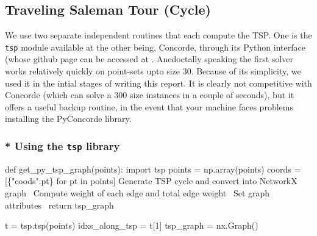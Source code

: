\subsection{Traveling Saleman Tour (Cycle)}

We use two separate independent routines that each compute the TSP. One is the 
\verb|tsp| module available at 
the other being, Concorde, through its Python interface (whose github page can be accessed at 
. Anedoctally speaking the first solver works relatively 
quickly on point-sets upto size 30. Because of its simplicity, we used it in the intial stages of writing
this report. It is clearly not competitive with Concorde (which can solve a 300 size instances in a couple of seconds), 
but it offers a useful backup routine, in the event that your machine faces problems installing the 
PyConcorde library. 

\subsubsection{* Using the \texttt{tsp} library}
\nwenddocs{}\plusendmoddef\nwstartdeflinemarkup{}\nwenddeflinemarkup
def get_py_tsp_graph(points):
     import tsp
     points = np.array(points)
     coords = [\{"coods":pt\} for pt in points]
     \LA{}Generate TSP cycle and convert into NetworkX graph~{\nwtagstyle{}}\RA{}
     \LA{}Compute weight of each edge and total edge weight~{\nwtagstyle{}}\RA{}
     \LA{}Set graph attributes~{\nwtagstyle{}}\RA{}     
     return tsp_graph
\nwendcode{}\nwdocspar


\nwenddocs{}\endmoddef\nwstartdeflinemarkup{}\nwenddeflinemarkup
t              = tsp.tsp(points)
idxs_along_tsp = t[1]
tsp_graph      = nx.Graph()

